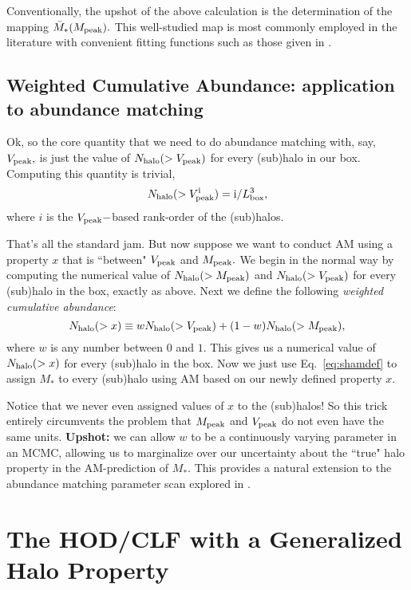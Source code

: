 \documentclass[usenatbib,usegraphicx,letterpaper]{mn2e}
\newcommand{\Nhalo}{N_{\rm halo}}
\newcommand{\mpeak}{M_{\rm peak}}
\newcommand{\vpeak}{V_{\rm peak}}
\newcommand{\beq}{\begin{equation}}
\newcommand{\eeq}{\end{equation}}
\newcommand{\mstar}{M_{\ast}}
\begin{document}
Conventionally, the upshot of the above calculation is the determination of the mapping $\bar{M}_{\ast}(\mpeak).$ This well-studied map is most commonly employed in the literature with convenient fitting functions such as those given in \citet{behroozi10,moster10,kravtsov13}. 

\subsection{Weighted Cumulative Abundance: application to abundance matching}
Ok, so the core quantity that we need to do abundance matching with, say, $\vpeak,$ is just the value of $\Nhalo(>\vpeak)$ for every (sub)halo in our box. Computing this quantity is trivial, $$\Nhalo(>\vpeak^{\rm i})={\rm i}/L^{3}_{\rm box},$$ where $i$ is the $\vpeak-$based rank-order of the (sub)halos. 

That's all the standard jam. But now suppose we want to conduct AM using a property $x$ that is ``between" $\vpeak$ and $\mpeak.$ We begin in the normal way by computing the numerical value of $\Nhalo(>\mpeak)$ and $\Nhalo(>\vpeak)$ for every (sub)halo in the box, exactly as above. Next we define the following {\em weighted cumulative abundance}:
\beq
\Nhalo(>x) \equiv w\Nhalo(>\vpeak) + (1-w)\Nhalo(>\mpeak), 
\eeq
where $w$ is any number between $0$ and $1.$ This gives us a numerical value of $\Nhalo(>x)$ for every (sub)halo in the box. 
Now we just use Eq.~\ref{eq:shamdef} to assign $\mstar$ to every (sub)halo using AM based on our newly defined property $x.$ 

Notice that we never even assigned values of $x$ to the (sub)halos! So this trick entirely circumvents the problem that $\mpeak$ and $\vpeak$ do not even have the same units. {\bf Upshot:} we can allow $w$ to be a continuously varying parameter in an MCMC, allowing us to  marginalize over our uncertainty about the ``true" halo property in the AM-prediction of $\mstar.$ This provides a natural extension to the abundance matching parameter scan explored in \citet{reddick12}. 


\section{The HOD/CLF with a Generalized Halo Property}
\label{sec:hodclf}
\end{document}
